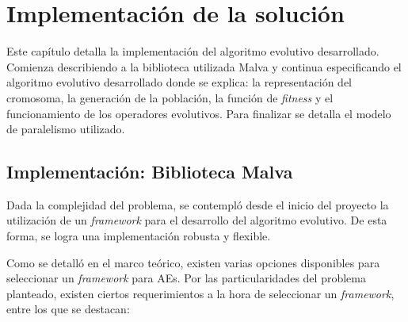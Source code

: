 \chapter{Implementación de la solución}

Este capítulo detalla la implementación del algoritmo evolutivo desarrollado. Comienza describiendo a la biblioteca utilizada Malva y continua especificando el algoritmo evolutivo desarrollado donde se explica: la representación del cromosoma, la generación de la población, la función de \emph{fitness} y el funcionamiento de los operadores evolutivos. Para finalizar se detalla el modelo de paralelismo utilizado.

\section{Implementación: Biblioteca Malva}

Dada la complejidad del problema, se contempló desde el inicio del proyecto la utilización de un \emph{framework} para el desarrollo del algoritmo evolutivo. De esta forma, se logra una implementación robusta y flexible. 

Como se detalló en el marco teórico, existen varias opciones disponibles para seleccionar un \emph{framework} para AEs. Por las particularidades del problema planteado, existen ciertos requerimientos a la hora de seleccionar un \emph{framework}, entre los que se destacan:

